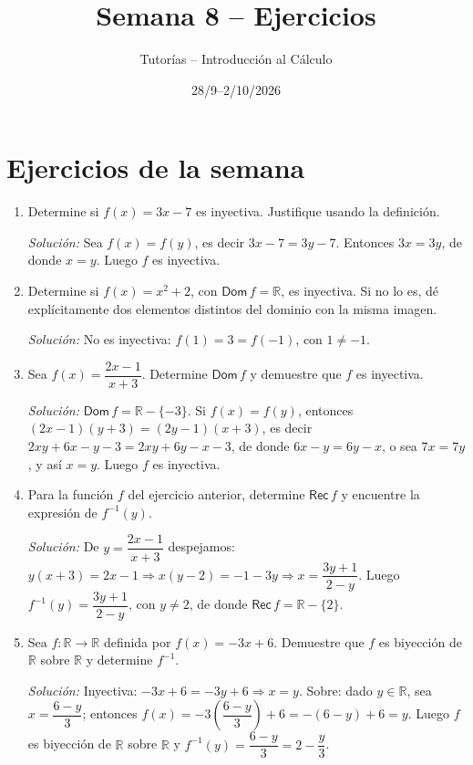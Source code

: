 \documentclass[11pt]{article}
\title{Semana 8 -- Ejercicios}
\author{Tutorías -- Introducción al Cálculo}
\date{28/9--2/10/2026}
\begin{document}
\maketitle

\section{Ejercicios de la semana}

\begin{enumerate}[label=\arabic*.]

\item Determine si $f(x) = 3x - 7$ es inyectiva. Justifique usando la
definición.

\textit{Solución:} Sea $f(x)=f(y)$, es decir $3x-7=3y-7$. Entonces $3x=3y$, de donde $x=y$. Luego
$f$ es inyectiva.

\item Determine si $f(x) = x^2 + 2$, con $\mathsf{Dom}\,f = \mathbb{R}$, es
inyectiva. Si no lo es, dé explícitamente dos elementos distintos del dominio
con la misma imagen.

\textit{Solución:} No es inyectiva: $f(1) = 3 = f(-1)$, con $1 \neq -1$.

\item Sea $f(x) = \dfrac{2x-1}{x+3}$. Determine $\mathsf{Dom}\,f$ y demuestre
que $f$ es inyectiva.

\textit{Solución:} $\mathsf{Dom}\,f = \mathbb{R}-\{-3\}$. Si $f(x)=f(y)$, entonces
$(2x-1)(y+3)=(2y-1)(x+3)$, es decir $2xy+6x-y-3 = 2xy+6y-x-3$, de donde $6x-y=6y-x$, o sea
$7x=7y$, y así $x=y$. Luego $f$ es inyectiva.

\item Para la función $f$ del ejercicio anterior, determine $\mathsf{Rec}\,f$
y encuentre la expresión de $f^{-1}(y)$.

\textit{Solución:} De $y=\dfrac{2x-1}{x+3}$ despejamos: $y(x+3)=2x-1 \Rightarrow x(y-2)=-1-3y
\Rightarrow x=\dfrac{3y+1}{2-y}$. Luego $f^{-1}(y)=\dfrac{3y+1}{2-y}$, con $y\neq 2$, de donde
$\mathsf{Rec}\,f = \mathbb{R}-\{2\}$.

\item Sea $f:\mathbb{R}\to\mathbb{R}$ definida por $f(x) = -3x+6$. Demuestre
que $f$ es biyección de $\mathbb{R}$ sobre $\mathbb{R}$ y determine $f^{-1}$.

\textit{Solución:} Inyectiva: $-3x+6=-3y+6 \Rightarrow x=y$. Sobre: dado $y\in\mathbb{R}$, sea
$x=\dfrac{6-y}{3}$; entonces $f(x)=-3\left(\dfrac{6-y}{3}\right)+6=-(6-y)+6=y$. Luego $f$ es
biyección de $\mathbb{R}$ sobre $\mathbb{R}$ y $f^{-1}(y)=\dfrac{6-y}{3}=2-\dfrac{y}{3}$.


\end{enumerate}
\end{document}
